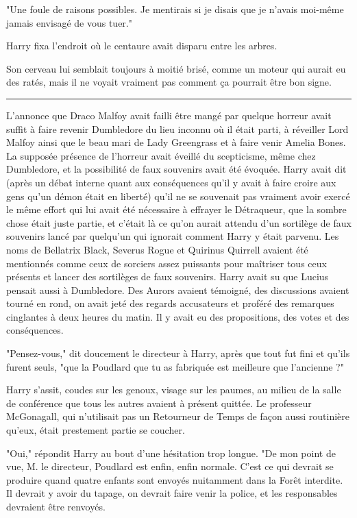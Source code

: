 "Une foule de raisons possibles. Je mentirais si je disais que je n'avais moi-même jamais envisagé de vous tuer."

Harry fixa l'endroit où le centaure avait disparu entre les arbres.

Son cerveau lui semblait toujours à moitié brisé, comme un moteur qui aurait eu des ratés, mais il ne voyait vraiment pas comment ça pourrait être bon signe.
\par\noindent\rule{\textwidth}{0.4pt}
L'annonce que Draco Malfoy avait failli être mangé par quelque horreur avait suffit à faire revenir Dumbledore du lieu inconnu où il était parti, à réveiller Lord Malfoy ainsi que le beau mari de Lady Greengrass et à faire venir Amelia Bones. La supposée présence de l'horreur avait éveillé du scepticisme, même chez Dumbledore, et la possibilité de faux souvenirs avait été évoquée. Harry avait dit (après un débat interne quant aux conséquences qu'il y avait à faire croire aux gens qu'un démon était en liberté) qu'il ne se souvenait pas vraiment avoir exercé le même effort qui lui avait été nécessaire à effrayer le Détraqueur, que la sombre chose était juste partie, et c'était là ce qu'on aurait attendu d'un sortilège de faux souvenirs lancé par quelqu'un qui ignorait comment Harry y était parvenu. Les noms de Bellatrix Black, Severus Rogue et Quirinus Quirrell avaient été mentionnés comme ceux de sorciers assez puissants pour maîtriser tous ceux présents et lancer des sortilèges de faux souvenirs. Harry avait su que Lucius pensait aussi à Dumbledore. Des Aurors avaient témoigné, des discussions avaient tourné en rond, on avait jeté des regards accusateurs et proféré des remarques cinglantes à deux heures du matin. Il y avait eu des propositions, des votes et des conséquences.

"Pensez-vous," dit doucement le directeur à Harry, après que tout fut fini et qu'ils furent seuls, "que la Poudlard que tu as fabriquée est meilleure que l'ancienne ?"

Harry s'assit, coudes sur les genoux, visage sur les paumes, au milieu de la salle de conférence que tous les autres avaient à présent quittée. Le professeur McGonagall, qui n'utilisait pas un Retourneur de Temps de façon aussi routinière qu'eux, était prestement partie se coucher.

"Oui," répondit Harry au bout d'une hésitation trop longue. "De mon point de vue, M. le directeur, Poudlard est enfin, enfin normale. C'est ce qui devrait se produire quand quatre enfants sont envoyés nuitamment dans la Forêt interdite. Il devrait y avoir du tapage, on devrait faire venir la police, et les responsables devraient être renvoyés.


